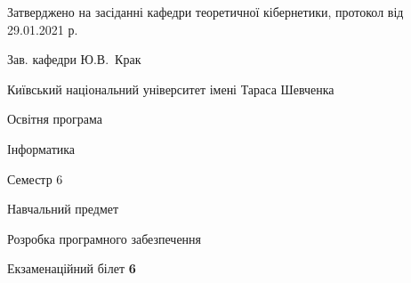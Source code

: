 \documentclass[10pt, ukrainian]{article}
\begin{document}
{\vspace{5mm}\smallskip \begin {small} Затверджено на засіданні кафедри теоретичної кібернетики, протокол  від   29.01.2021 р.\par\smallskip\smallskip
{\parbox {6.5 cm}{Зав. кафедри \dotfill Ю.В.~Крак}} \end{small}}
\newpage

{{\begin {small}\par
{ \center  Київський національний університет імені Тараса Шевченка \par}
{\parbox {5 cm}{Освітня програма \hfill}{\parbox {7 cm}{Інформатика \hfill}}\parbox {6 cm}{\hfill Семестр 6}}\par
{\parbox {5 cm} {Навчальний предмет \hfill}\parbox {7 cm}{Розробка програмного забезпечення \hfill}\parbox {6cm}{\hfill}\par}\vspace{-7pt} \end{small}}{\center Екзаменаційний білет \No \textbf
{ 6 }\par}}
\end{document}
